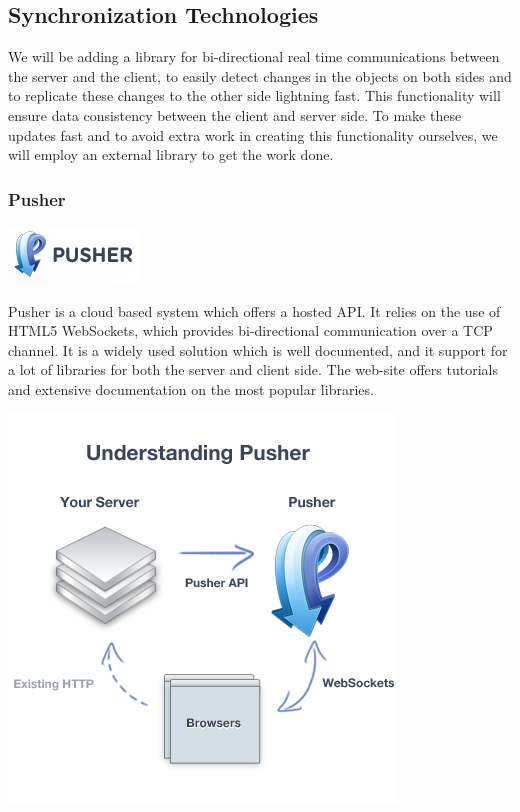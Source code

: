 \subsection{Synchronization Technologies}
We will be adding a library for bi-directional real time communications between the server and the client, to easily detect changes in the objects on both sides and to replicate these changes to the other side lightning fast. This functionality will ensure data consistency between the client and server side. To make these updates fast and to avoid extra work in creating this functionality ourselves, we will employ an external library to get the work done.

\subsubsection{Pusher}

\includegraphics{image/pusher-logo.jpg}

Pusher is a cloud based system which offers a hosted API. It relies on the use of HTML5 WebSockets, which provides bi-directional communication over a TCP channel. It is a widely used solution which is well documented, and it support for a lot of libraries for both the server and client side. The web-site offers tutorials and extensive documentation on the most popular libraries. 

\includegraphics[scale=0.5]{image/pusher-explained.png}

